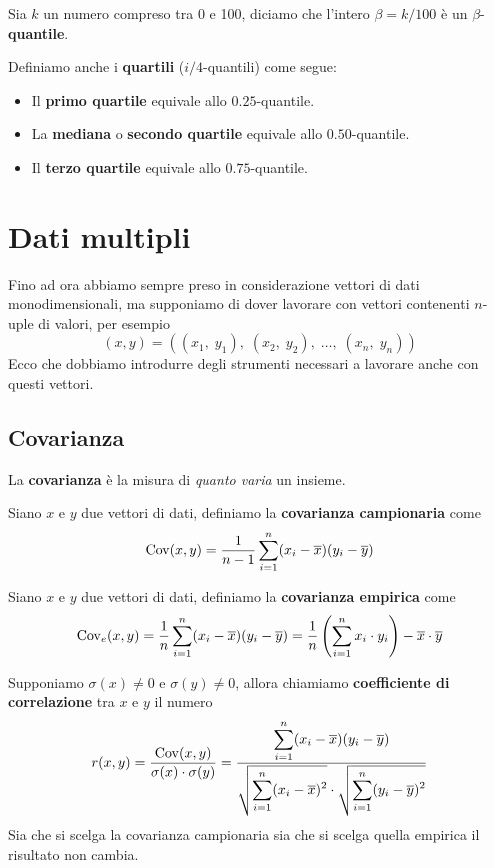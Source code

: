 \begin{definition}
	Sia $k$ un numero compreso tra 0 e 100, diciamo che l'intero $\beta = k / 100$ è un
	$\beta$-\textbf{quantile}.
\end{definition}

\begin{definition}
	Definiamo anche i \textbf{quartili} ($i/4$-quantili) come segue:
	\begin{itemize}
		\item Il \textbf{primo quartile} equivale allo $0.25$-quantile.
		\item La \textbf{mediana} o \textbf{secondo quartile} equivale allo $0.50$-quantile.
		\item Il \textbf{terzo quartile} equivale allo $0.75$-quantile.
	\end{itemize}
\end{definition}

\section{Dati multipli}
Fino ad ora abbiamo sempre preso in considerazione vettori di dati monodimensionali, ma supponiamo di dover
lavorare con vettori contenenti $n$-uple di valori, per esempio
\[ (x, y) = ((x_1, \; y_1), \; (x_2, \; y_2), \; \dots, \; (x_n, \; y_n)) \]
Ecco che dobbiamo introdurre degli strumenti necessari a lavorare anche con questi vettori.

\subsection{Covarianza}
La \textbf{covarianza} è la misura di \emph{quanto varia} un insieme.

\begin{definition}
	Siano $x$  e $y$ due vettori di dati, definiamo la \textbf{covarianza campionaria} come
	\[ \operatorname{Cov}(x, y) = \frac{1}{n - 1} \sum_{i=1}^n (x_i - \overline{x}) (y_i - \overline{y}) \]
\end{definition}

\begin{definition}
	Siano $x$  e $y$ due vettori di dati, definiamo la \textbf{covarianza empirica} come
	\[
		\operatorname{Cov}_e(x, y) = \frac{1}{n} \sum_{i=1}^n (x_i - \overline{x}) (y_i - \overline{y}) =
		\frac{1}{n} \left( \sum_{i=1}^n x_i \cdot y_i \right) - \overline{x} \cdot \overline{y}
	\]
\end{definition}

\begin{definition}
	Supponiamo $\sigma (x) \neq 0$ e $\sigma (y) \neq 0$, allora chiamiamo \textbf{coefficiente di correlazione}
	tra $x$ e $y$ il numero
	\[
		r(x, y) = \frac{\operatorname{Cov} (x, y)}{\sigma (x) \cdot \sigma (y)} =
		\frac{\displaystyle\sum_{i=1}^n (x_i - \overline{x})(y_i - \overline{y})}
		{\sqrt{\displaystyle\sum_{i=1}^n (x_i - \overline{x})^2} \cdot
			\sqrt{\displaystyle\sum_{i=1}^n (y_i - \overline{y})^2}}
	\]
	Sia che si scelga la covarianza campionaria sia che si scelga quella empirica il risultato non cambia.
\end{definition}

